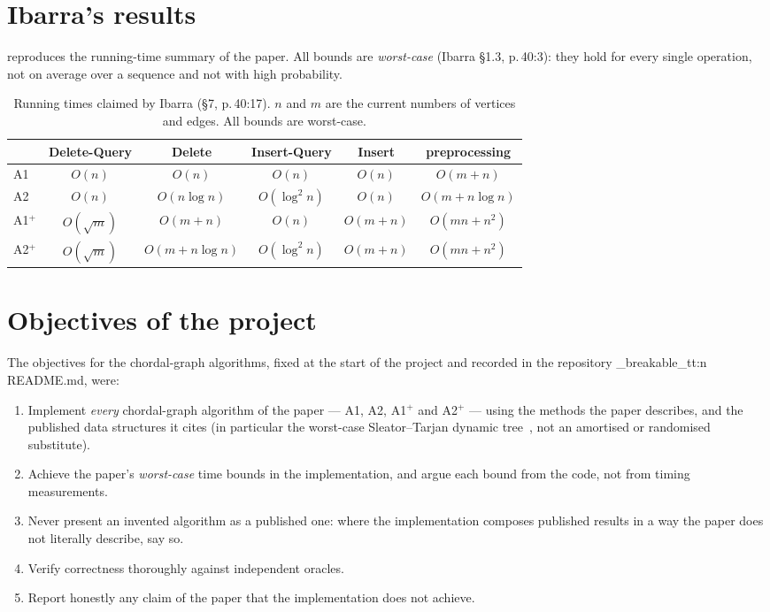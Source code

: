 \documentclass[11pt,a4paper,oneside]{report}
\theoremstyle{plain}
\theoremstyle{definition}
\theoremstyle{remark}
\newcommand{\op}[1]{\textsf{#1}}
\DeclareRobustCommand{\file}[1]{\mtp_breakable_tt:n {#1}}
\begin{document}
\section{Ibarra's results}
 reproduces the running-time summary of the paper. All bounds are
\emph{worst-case} (Ibarra \S1.3, p.\,40:3): they hold for every single operation, not on average over a
sequence and not with high probability.

\begin{table}[ht]
\centering
\caption[Running times claimed by Ibarra]{Running times claimed by Ibarra (\S7, p.\,40:17). \(n\) and \(m\) are the current
numbers of vertices and edges. All bounds are worst-case.}\label{tab:paper-bounds}
\begin{tabular}{@{}lccccc@{}}
\toprule
& \op{Delete-Query} & \op{Delete} & \op{Insert-Query} & \op{Insert} & preprocessing\\
\midrule
A1 & \(O(n)\) & \(O(n)\) & \(O(n)\) & \(O(n)\) & \(O(m+n)\)\\
A2 & \(O(n)\) & \(O(n\log n)\) & \(O(\log^2 n)\) & \(O(n)\) & \(O(m+n\log n)\)\\
A1\(^+\) & \(O(\sqrt m)\) & \(O(m+n)\) & \(O(n)\) & \(O(m+n)\) & \(O(mn+n^2)\)\\
A2\(^+\) & \(O(\sqrt m)\) & \(O(m+n\log n)\) & \(O(\log^2 n)\) & \(O(m+n)\) & \(O(mn+n^2)\)\\
\bottomrule
\end{tabular}
\end{table}

\section{Objectives of the project}
The objectives for the chordal-graph algorithms, fixed at the start of the project and
recorded in the repository \file{README.md}, were:
\begin{enumerate}
\item Implement \emph{every} chordal-graph algorithm of the paper --- A1, A2, A1\(^+\) and
  A2\(^+\) --- using the methods the paper describes, and the published data structures
  it cites (in particular the worst-case Sleator--Tarjan dynamic tree~\cite{sleator1983}, not an
  amortised or randomised substitute).
\item Achieve the paper's \emph{worst-case} time bounds in the implementation, and argue each
  bound from the code, not from timing measurements.
\item Never present an invented algorithm as a published one: where the implementation
  composes published results in a way the paper does not literally describe, say so.
\item Verify correctness thoroughly against independent oracles.
\item Report honestly any claim of the paper that the implementation does not achieve.
\end{enumerate}
\end{document}
